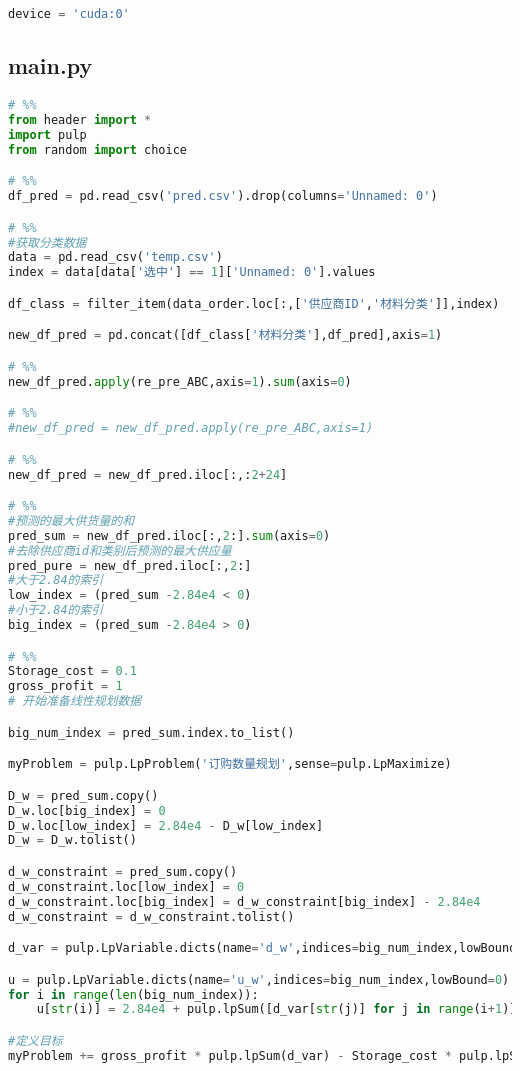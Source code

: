 \begin{appendices}
\begin{lstlisting}[language=python]
device = 'cuda:0'
\end{lstlisting}

\subsection{main.py}

\begin{lstlisting}[language=python]
# %%
from header import *
import pulp
from random import choice

# %%
df_pred = pd.read_csv('pred.csv').drop(columns='Unnamed: 0')

# %%
#获取分类数据
data = pd.read_csv('temp.csv')
index = data[data['选中'] == 1]['Unnamed: 0'].values

df_class = filter_item(data_order.loc[:,['供应商ID','材料分类']],index)

new_df_pred = pd.concat([df_class['材料分类'],df_pred],axis=1)

# %%
new_df_pred.apply(re_pre_ABC,axis=1).sum(axis=0)

# %%
#new_df_pred = new_df_pred.apply(re_pre_ABC,axis=1)

# %%
new_df_pred = new_df_pred.iloc[:,:2+24]

# %%
#预测的最大供货量的和
pred_sum = new_df_pred.iloc[:,2:].sum(axis=0)
#去除供应商id和类别后预测的最大供应量
pred_pure = new_df_pred.iloc[:,2:]
#大于2.84的索引
low_index = (pred_sum -2.84e4 < 0)
#小于2.84的索引
big_index = (pred_sum -2.84e4 > 0)

# %%
Storage_cost = 0.1
gross_profit = 1
# 开始准备线性规划数据

big_num_index = pred_sum.index.to_list()

myProblem = pulp.LpProblem('订购数量规划',sense=pulp.LpMaximize)

D_w = pred_sum.copy()
D_w.loc[big_index] = 0
D_w.loc[low_index] = 2.84e4 - D_w[low_index]
D_w = D_w.tolist()

d_w_constraint = pred_sum.copy()
d_w_constraint.loc[low_index] = 0
d_w_constraint.loc[big_index] = d_w_constraint[big_index] - 2.84e4
d_w_constraint = d_w_constraint.tolist()

d_var = pulp.LpVariable.dicts(name='d_w',indices=big_num_index,lowBound=0)

u = pulp.LpVariable.dicts(name='u_w',indices=big_num_index,lowBound=0)
for i in range(len(big_num_index)):
    u[str(i)] = 2.84e4 + pulp.lpSum([d_var[str(j)] for j in range(i+1)]) - sum(D_w[:i+1])

#定义目标
myProblem += gross_profit * pulp.lpSum(d_var) - Storage_cost * pulp.lpSum(u)


\end{lstlisting}
\end{appendices}
